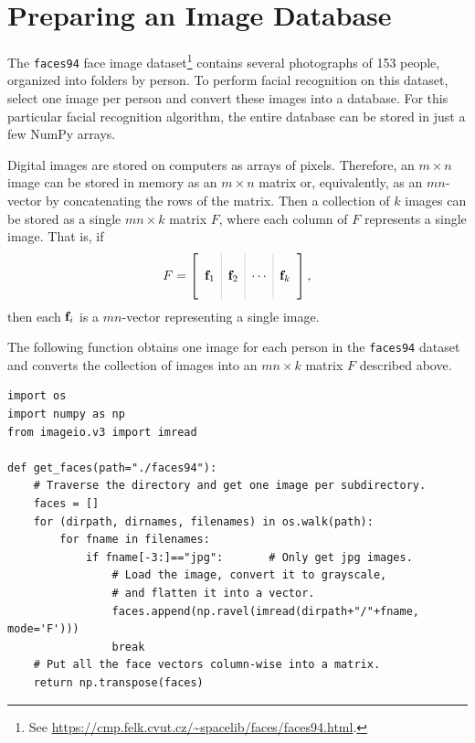 \label{lab:FacialRecognition}


\section*{Preparing an Image Database} %

The \texttt{faces94} face image dataset\footnote{See \url{https://cmp.felk.cvut.cz/~spacelib/faces/faces94.html}.} contains several photographs of 153 people, organized into folders by person.
To perform facial recognition on this dataset, select one image per person and convert these images into a database.
For this particular facial recognition algorithm, the entire database can be stored in just a few NumPy arrays.

Digital images are stored on computers as arrays of pixels.
Therefore, an $m \times n$ image can be stored in memory as an $m\times n$ matrix or, equivalently, as an $mn$-vector by concatenating the rows of the matrix.
Then a collection of $k$ images can be stored as a single $mn\times k$ matrix $F$, where each column of $F$ represents a single image.
That is, if
\[
F = \left[\begin{array}{c|c|c|c}
\arrayrulecolor{lightgray}
& & & \\
\f_1 & \f_2 & \cdots & \f_k
\\
& & &
\end{array}\right],
\]
then each $\mathbf{f}_i$ is a $mn$-vector representing a single image.

The following function obtains one image for each person in the \texttt{faces94} dataset and converts the collection of images into an $mn \times k$ matrix $F$ described above.

\begin{lstlisting}
import os
import numpy as np
from imageio.v3 import imread

def get_faces(path="./faces94"):
    # Traverse the directory and get one image per subdirectory.
    faces = []
    for (dirpath, dirnames, filenames) in os.walk(path):
        for fname in filenames:
            if fname[-3:]=="jpg":       # Only get jpg images.
                # Load the image, convert it to grayscale,
                # and flatten it into a vector.
                faces.append(np.ravel(imread(dirpath+"/"+fname, mode='F')))
                break
    # Put all the face vectors column-wise into a matrix.
    return np.transpose(faces)
\end{lstlisting}

